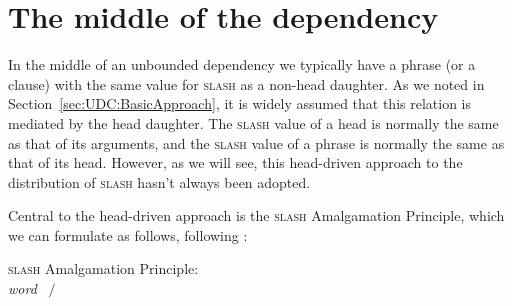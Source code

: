 \documentclass[output=paper
,notxmath 
 	        ,biblatex
                ,babelshorthands
                ,newtxmath
                ,draftmode
                ,colorlinks, citecolor=brown
]{langscibook}
\begin{document}

  





\section{The middle of the dependency}
\label{sec:UDC:Middle}

In the middle of an unbounded dependency we typically have a phrase
(or a clause) with the same value for \textsc{slash} as a non-head daughter. As
we noted in Section~\ref{sec:UDC:BasicApproach}, it is widely assumed
that this relation is mediated by the head daughter. The \textsc{slash} value
of a head is normally the same as that of its arguments, and the \textsc{slash}
value of a phrase is normally the same as that of its head. However,
as we will see, this head-driven approach to the distribution of \textsc{slash}
hasn't always been adopted.

Central to the head-driven approach is the \textsc{slash} Amalgamation Principle,
which we can formulate as follows, following \citet[199]{Ginzburg:Sag:01}:

\ea
\label{fig:UDC:32}\label{udc:slash-amalgamation-principle}
\textsc{slash} Amalgamation Principle:\\
   \textit{word} \impl ~$\slash$%
\z
\end{document}
